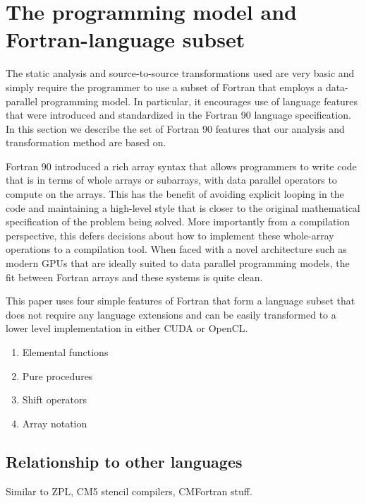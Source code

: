 \documentclass[10pt, conference, compsocconf]{IEEEtran}
\begin{document}
\section{The programming model and Fortran-language subset}

The static analysis and source-to-source transformations used are very
basic and simply require the programmer to use a subset of Fortran
that employs a data-parallel programming model.  In particular, it
encourages use of language features that were introduced and
standardized in the Fortran 90 language specification.  In this
section we describe the set of Fortran 90 features that our analysis
and transformation method are based on.

Fortran 90 introduced a rich array syntax that allows programmers to
write code that is in terms of whole arrays or subarrays, with data
parallel operators to compute on the arrays.  This has the benefit of
avoiding explicit looping in the code and maintaining a high-level
style that is closer to the original mathematical specification of the
problem being solved.  More importantly from a compilation
perspective, this defers decisions about how to implement these
whole-array operations to a compilation tool.  When faced with a novel
architecture such as modern GPUs that are ideally suited to data parallel
programming models, the fit between Fortran arrays and these systems is
quite clean.

This paper uses four simple features of Fortran that form a language subset
that does not require any language extensions and can be easily transformed
to a lower level implementation in either CUDA or OpenCL.

\begin{enumerate}
\item Elemental functions
\item Pure procedures
\item Shift operators
\item Array notation
\end{enumerate}

\subsection{Relationship to other languages}

Similar to ZPL, CM5 stencil compilers, CMFortran stuff.


%
% 
\end{document}
